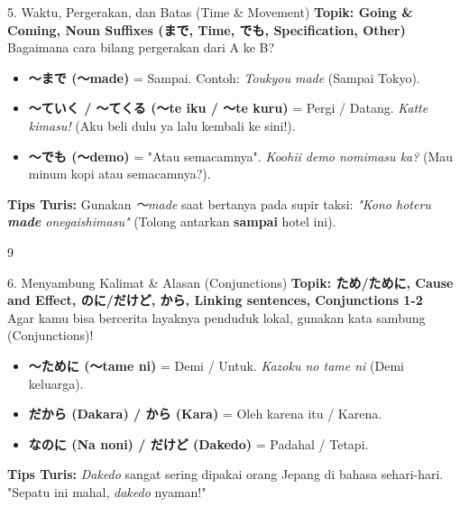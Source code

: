 \begin{lessonbox}{5. Waktu, Pergerakan, dan Batas (Time \& Movement)}
    \textbf{Topik: Going \& Coming, Noun Suffixes (まで, Time, でも, Specification, Other)} \\
    Bagaimana cara bilang pergerakan dari A ke B? 
    \begin{itemize}
        \item \textbf{〜まで (〜made)} = Sampai. Contoh: \textit{Toukyou made} (Sampai Tokyo).
        \item \textbf{〜ていく / 〜てくる (〜te iku / 〜te kuru)} = Pergi / Datang. \textit{Katte kimasu!} (Aku beli dulu ya lalu kembali ke sini!).
        \item \textbf{〜でも (〜demo)} = "Atau semacamnya". \textit{Koohii demo nomimasu ka?} (Mau minum kopi atau semacamnya?).
    \end{itemize}
    \textbf{Tips Turis:} Gunakan \textit{〜made} saat bertanya pada supir taksi: \textit{"Kono hoteru \textbf{made} onegaishimasu"} (Tolong antarkan \textbf{sampai} hotel ini).
\end{lessonbox}

\begin{convobox}{9}
    \noindent
      

    \vspace{1.5em}
\end{convobox}

\begin{lessonbox}{6. Menyambung Kalimat \& Alasan (Conjunctions)}
    \textbf{Topik: ため/ために, Cause and Effect, のに/だけど, から, Linking sentences, Conjunctions 1-2} \\
    Agar kamu bisa bercerita layaknya penduduk lokal, gunakan kata sambung (Conjunctions)!
    \begin{itemize}
        \item \textbf{〜ために (〜tame ni)} = Demi / Untuk. \textit{Kazoku no tame ni} (Demi keluarga).
        \item \textbf{だから (Dakara) / から (Kara)} = Oleh karena itu / Karena.
        \item \textbf{なのに (Na noni) / だけど (Dakedo)} = Padahal / Tetapi.
    \end{itemize}
    \textbf{Tips Turis:} \textit{Dakedo} sangat sering dipakai orang Jepang di bahasa sehari-hari. "Sepatu ini mahal, \textit{dakedo} nyaman!"
\end{lessonbox}

